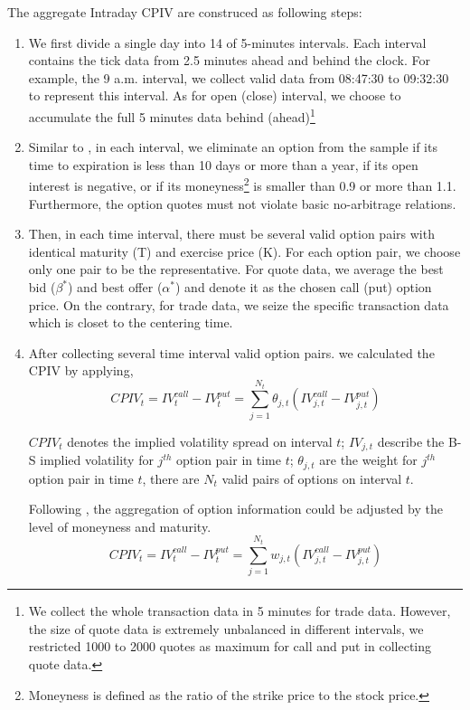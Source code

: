 The aggregate Intraday CPIV are construced as following steps: 
\begin{enumerate}
\item  We first divide a single day into 14 of 5-minutes intervals. Each interval contains the tick data from 2.5 minutes ahead and behind the clock. For example, the 9 a.m. interval, we collect valid data from 08:47:30 to 09:32:30 to represent this interval. As for open (close) interval, we choose to accumulate the full 5 minutes data behind (ahead)\footnote{We collect the whole transaction data in 5 minutes for trade data. However, the size of quote data is extremely unbalanced in different intervals, we restricted 1000 to 2000 quotes as maximum for call and put in collecting quote data.}

\item Similar to \textcite{xing2010does}, in each interval, we eliminate an option from the sample if its time to expiration is less than 10 days or more than a year, if its open interest is negative, or if its moneyness\footnote{Moneyness is defined as the ratio of the strike price to the stock price.} is smaller than 0.9 or more than 1.1. Furthermore, the option quotes must not violate basic no-arbitrage relations.

\item Then, in each time interval, there must be several valid option pairs with identical maturity (T) and exercise price (K). For each option pair, we choose only one pair to be the representative. For quote data, we average the best bid ($\beta ^{\ast }$) and best offer ($\alpha ^{\ast }$) and denote it as the chosen call (put) option price. On the contrary, for trade data, we seize the specific transaction data which is closet to the centering time.  

\item After collecting several time interval valid option pairs. we calculated the CPIV by applying, 
 \begin{equation} \label{eq: withoutadj}
CPIV_{t} = IV_{t}^{call} - IV_{t}^{put} = \sum_{j = 1}^{N_{t}}\theta _{j,t}(IV_{j,t}^{call} - IV_{j,t}^{put})
 \end{equation}
 
$CPIV_{t}$ denotes the implied volatility spread on interval $t$; $IV_{j,t}$ describe the B-S implied volatility for $j^{th}$ option pair in time $t$; $\theta_{j,t}$ are the weight for $j^{th}$ option pair in time $t$, there are $N_{t}$ valid pairs of options on interval $t$. 

Following \textcite{holowczak2013aggregating}, the aggregation of option information could be adjusted by the level of moneyness and maturity. 
 \begin{equation} \label{eq: withadj}
CPIV_{t} = IV_{t}^{call} - IV_{t}^{put} = \sum_{j = 1}^{N_{t}}w_{j,t}(IV_{j,t}^{call} - IV_{j,t}^{put})
 \end{equation}


\end{enumerate}

